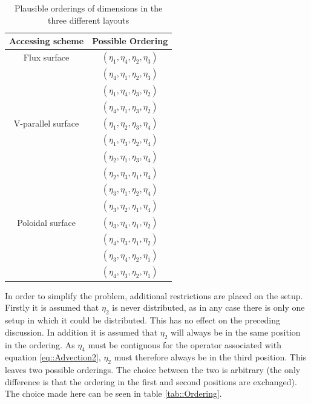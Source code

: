 \begin{table}[ht]
\centering
 \begin{tabular}{|c|c|}
  \hline
  Accessing scheme & Possible Ordering\\
  \hline
  Flux surface & $(\eta_1,\eta_4,\eta_2,\eta_3)$\\
               & $(\eta_4,\eta_1,\eta_2,\eta_3)$\\
               & $(\eta_1,\eta_4,\eta_3,\eta_2)$\\
               & $(\eta_4,\eta_1,\eta_3,\eta_2)$\\
  \hline
  V-parallel surface & $(\eta_1,\eta_2,\eta_3,\eta_4)$\\
                     & $(\eta_1,\eta_3,\eta_2,\eta_4)$\\
                     & $(\eta_2,\eta_1,\eta_3,\eta_4)$\\
                     & $(\eta_2,\eta_3,\eta_1,\eta_4)$\\
                     & $(\eta_3,\eta_1,\eta_2,\eta_4)$\\
                     & $(\eta_3,\eta_2,\eta_1,\eta_4)$\\
  \hline
  Poloidal surface & $(\eta_3,\eta_4,\eta_1,\eta_2)$\\
                   & $(\eta_4,\eta_3,\eta_1,\eta_2)$\\
                   & $(\eta_3,\eta_4,\eta_2,\eta_1)$\\
                   & $(\eta_4,\eta_3,\eta_2,\eta_1)$\\
  \hline
 \end{tabular}
 \caption{\label{tab::Possible Ordering} Plausible orderings of dimensions in the three different layouts}
\end{table}

In order to simplify the problem, additional restrictions are placed on the setup. Firstly it is assumed that $\eta_2$ is never distributed, as in any case there is only one setup in which it could be distributed. This has no effect on the preceding discussion. In addition it is assumed that $\eta_2$ will always be in the same position in the ordering. As $\eta_4$ must be contiguous for the operator associated with equation \ref{eq::Advection2}, $\eta_2$ must therefore always be in the third position. This leaves two possible orderings. The choice between the two is arbitrary (the only difference is that the ordering in the first and second positions are exchanged). The choice made here can be seen in table \ref{tab::Ordering}.

